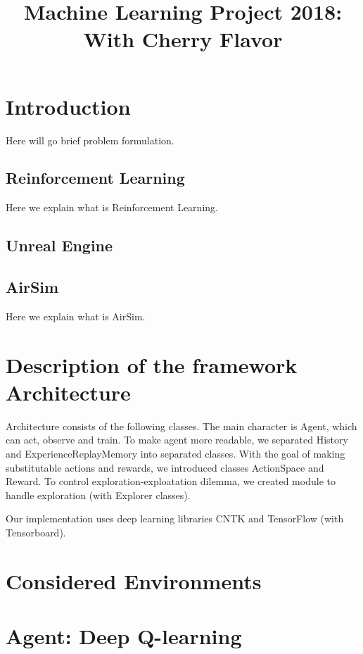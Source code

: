 \documentclass{article}
\begin{document}
\title{Machine Learning Project 2018: With Cherry Flavor}
\maketitle

\section{Introduction}

\cite{cad2rl}


Here will go  brief problem formulation.

\subsection{Reinforcement Learning}

Here we explain what is Reinforcement Learning.

\subsection{Unreal Engine}

\subsection{AirSim}

Here we explain what is AirSim.
\cite{airsim2017fsr}

\section{Description of the framework Architecture}

Architecture consists of the following classes. The main character is Agent, which can act, observe and train.
To make agent more readable, we separated History and ExperienceReplayMemory into separated classes.
With the goal of making substitutable actions and rewards, we introduced classes ActionSpace and Reward.
To control exploration-exploatation dilemma, we created module to handle exploration (with Explorer classes).

Our implementation uses deep learning libraries CNTK and TensorFlow (with Tensorboard).

\section{Considered Environments}

\section{Agent: Deep Q-learning}
\end{document}
